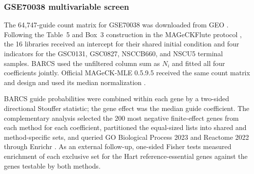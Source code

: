 \subsubsection{GSE70038 multivariable screen}

The 64,747-guide count matrix for GSE70038 was downloaded from GEO
\citep{toledo2015pkmyt1}.  Following the Table~5 and Box~3 construction in the
MAGeCKFlute protocol \citep{wang2019mageckflute}, the 16 libraries received an
intercept for their shared initial condition and four indicators for the
GSC0131, GSC0827, NSCCB660, and NSCU5 terminal samples.  BARCS used the
unfiltered column sum as $N_i$ and fitted all four coefficients jointly.
Official MAGeCK-MLE 0.5.9.5 received the same count matrix and design and used
its median normalization \citep{li2014mageck}.

BARCS guide probabilities were combined within each gene by a two-sided
directional Stouffer statistic; the gene effect was the
median guide coefficient.  The complementary analysis selected the 200 most
negative finite-effect genes from each method for each coefficient, partitioned
the equal-sized lists into shared and method-specific sets, and queried GO
Biological Process 2023 and Reactome 2022 through Enrichr
\citep{chen2013enrichr}.  As an external follow-up, one-sided Fisher tests
measured enrichment of each exclusive set for the Hart reference-essential
genes \citep{hart2017evaluation} against the genes testable by both methods.
